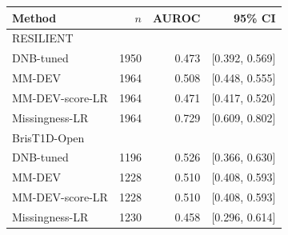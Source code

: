 \begin{tabular*}{\linewidth}{@{\extracolsep{\fill}}lrrr@{}}
\toprule
Method & $n$ & AUROC & 95\% CI \\
\midrule
\multicolumn{4}{l}{RESILIENT} \\
\midrule
DNB-tuned & 1950 & 0.473 & [0.392, 0.569] \\
MM-DEV & 1964 & 0.508 & [0.448, 0.555] \\
MM-DEV-score-LR & 1964 & 0.471 & [0.417, 0.520] \\
Missingness-LR & 1964 & 0.729 & [0.609, 0.802] \\
\midrule
\multicolumn{4}{l}{BrisT1D-Open} \\
\midrule
DNB-tuned & 1196 & 0.526 & [0.366, 0.630] \\
MM-DEV & 1228 & 0.510 & [0.408, 0.593] \\
MM-DEV-score-LR & 1228 & 0.510 & [0.408, 0.593] \\
Missingness-LR & 1230 & 0.458 & [0.296, 0.614] \\
\bottomrule
\end{tabular*}
